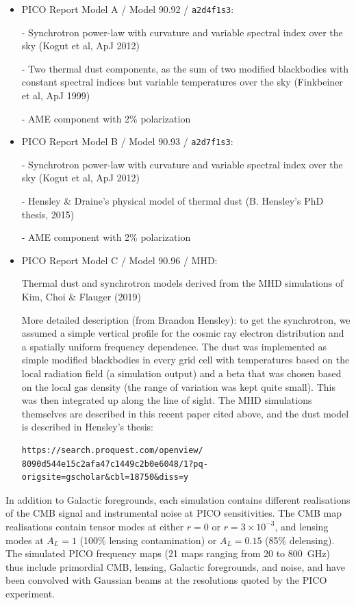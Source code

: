 \documentclass[12pt]{article}
\begin{document}
\begin{itemize}
\item PICO Report Model A / Model 90.92  / {\tt a2d4f1s3}: 

- Synchrotron power-law with curvature and variable spectral index over the sky (Kogut et al, ApJ 2012)

- Two thermal dust components, as the sum of two modified blackbodies with constant spectral indices but variable temperatures over the sky (Finkbeiner et al,  ApJ 1999)

- AME component with 2\% polarization

\item PICO Report Model B / Model 90.93 / {\tt a2d7f1s3}: 

- Synchrotron power-law with curvature and variable spectral index over the sky (Kogut et al, ApJ 2012)

- Hensley \& Draine's physical model of thermal dust (B. Hensley's PhD thesis, 2015) 

- AME component with 2\% polarization

\item PICO Report Model C / Model 90.96 / MHD: 

Thermal dust and synchrotron models derived from the MHD simulations of Kim, Choi \& Flauger (2019)

More detailed description (from Brandon Hensley): to get the synchrotron, we assumed a simple vertical profile for the cosmic ray electron distribution and a spatially uniform frequency dependence. The dust was implemented as simple modified blackbodies in every grid cell with temperatures based on the local radiation field (a simulation output) and a beta that was chosen based on the local gas density (the range of variation was kept quite small). This was then integrated up along the line of sight. The MHD simulations themselves are described in this recent paper cited above, and the dust model is described in Hensley's thesis: 
\begin{verbatim} 
https://search.proquest.com/openview/
8090d544e15c2afa47c1449c2b0e6048/1?pq-origsite=gscholar&cbl=18750&diss=y
\end{verbatim}
\end{itemize}

In addition to Galactic foregrounds, each simulation contains different realisations of the CMB signal and instrumental noise at PICO sensitivities. The CMB map realisations contain tensor modes at either $r=0$ or $r=3\times 10^{-3}$, and lensing modes at $A_L=1$ (100\% lensing contamination) or $A_L=0.15$ (85\% delensing). The simulated PICO frequency maps (21 maps ranging from $20$ to $800$\, GHz) thus include primordial CMB, lensing, Galactic foregrounds, and noise, and have been convolved with Gaussian beams at the resolutions quoted by the PICO experiment.
\end{document}
